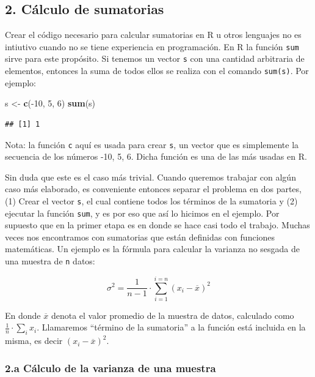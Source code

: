 \documentclass[]{article}
\newenvironment{Shaded}{}{}
\newcommand{\KeywordTok}[1]{\textcolor[rgb]{0.00,0.44,0.13}{\textbf{{#1}}}}
\newcommand{\DecValTok}[1]{\textcolor[rgb]{0.25,0.63,0.44}{{#1}}}
\newcommand{\NormalTok}[1]{{#1}}
\begin{document}
\subsection{2. Cálculo de sumatorias}

Crear el código necesario para calcular sumatorias en R u otros
lenguajes no es intiutivo cuando no se tiene experiencia en
programación. En R la función \texttt{sum} sirve para este propósito. Si
tenemos un vector \texttt{s} con una cantidad arbitraria de elementos,
entonces la suma de todos ellos se realiza con el comando
\texttt{sum(s)}. Por ejemplo:

\begin{Shaded}
\begin{Highlighting}[]
\NormalTok{s <- }\KeywordTok{c}\NormalTok{(-}\DecValTok{10}\NormalTok{, }\DecValTok{5}\NormalTok{, }\DecValTok{6}\NormalTok{)}
\KeywordTok{sum}\NormalTok{(s)}
\end{Highlighting}
\end{Shaded}
\begin{verbatim}
## [1] 1
\end{verbatim}
Nota: la función \texttt{c} aquí es usada para crear \texttt{s}, un
vector que es simplemente la secuencia de los números -10, 5, 6. Dicha
función es una de las más usadas en R.

Sin duda que este es el caso más trivial. Cuando queremos trabajar con
algún caso más elaborado, es conveniente entonces separar el problema en
dos partes, (1) Crear el vector \texttt{s}, el cual contiene todos los
términos de la sumatoria y (2) ejecutar la función \texttt{sum}, y es
por eso que así lo hicimos en el ejemplo. Por supuesto que en la primer
etapa es en donde se hace casi todo el trabajo. Muchas veces nos
encontramos con sumatorias que están definidas con funciones
matemáticas. Un ejemplo es la fórmula para calcular la varianza no
sesgada de una muestra de \texttt{n} datos:

\[
  \sigma ^ 2 = \frac{1}{n - 1} \cdot \sum_{i=1}^{i=n} (x_i - \overline{x}) ^ 2 
\]

En donde $\overline{x}$ denota el valor promedio de la muestra de datos,
calculado como $\frac{1}{n} \cdot \sum_i x_i$. Llamaremos ``término de
la sumatoria'' a la función está incluida en la misma, es decir
$(x_i - \overline{x}) ^ 2$.

\subsubsection{2.a Cálculo de la varianza de una muestra}
\end{document}
